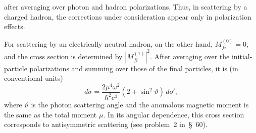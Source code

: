 after averaging over photon and hadron polarizations. Thus, in scattering by a charged hadron, the corrections under consideration appear only in polarization effects.

For scattering by an electrically neutral hadron, on the other hand, $M_{fi}^{(0)}=0$, and the cross section is determined by $|M_{fi}^{(1)}|^2$. After averaging over the initial-particle polarizations and summing over those of the final particles, it is (in conventional units)
\begin{equation}
d\sigma=\frac{2\mu^4\omega^2}{\hbar^2c^4}(2+\sin^2\vartheta)\,do',
\tag{141.11}
\end{equation}
where $\vartheta$ is the photon scattering angle and the anomalous magnetic moment is the same as the total moment $\mu$. In its angular dependence, this cross section corresponds to antisymmetric scattering (see problem~2 in~\S~60).
